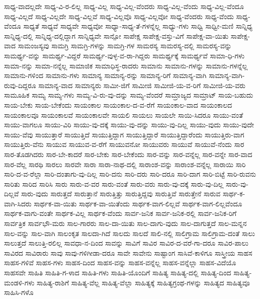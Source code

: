 {ಸಾಧ್ಯ-ವಾದಲ್ಲದೇ
ಸಾಧ್ಯ-ವಿ-ರ-ಲಿಲ್ಲ
ಸಾಧ್ಯ-ವಿಲ್ಲ
ಸಾಧ್ಯ-ವಿಲ್ಲ-ವೆಂದರು
ಸಾಧ್ಯ-ವಿಲ್ಲ-ವೆಂದು
ಸಾಧ್ಯ-ವಿಲ್ಲ-ವೆಂದೂ
ಸಾಧ್ಯ-ವಿಲ್ಲದೆ
ಸಾಧ್ಯ-ವಿಲ್ಲದೇ
ಸಾಧ್ಯ-ವಿಲ್ಲವೆ
ಸಾಧ್ಯ-ವಿಲ್ಲವೊ
ಸಾಧ್ಯ-ವಿಲ್ಲವೋ
ಸಾಧ್ಯ-ವೆಂದರು
ಸಾಧ್ಯ-ವೆಂದು
ಸಾಧ್ಯ-ವೆಂದೂ
ಸಾಧ್ಯತೆ
ಸಾಧ್ಯವೆ
ಸಾಧ್ಯವೇ
ಸಾಧ್ಯವೋ
ಸಾಧ್ಯಾ-ಸಾಧ್ಯ-ತೆ-ಗಳನ್ನೆಲ್ಲ
ಸಾಧ್ಯು-ಗಳು
ಸಾಧ್ವಿ
ಸಾಧ್ವೀ-ಮಣಿ
ಸಾನ್ನಿಧ್ಯ
ಸಾನ್ನಿಧ್ಯ-ದಲ್ಲಿ
ಸಾನ್ನಿಧ್ಯ-ದಲ್ಲಿದ್ದಾಗ
ಸಾನ್ನಿಧ್ಯವೇ
ಸಾನ್ಪೋ
ಸಾಪೇಕ್ಷ
ಸಾಪೇಕ್ಷ-ವಸ್ತು-ವಿಗೆ
ಸಾಪೇಕ್ಷ-ವಾ-ಯಿತು
ಸಾಪೇಕ್ಷ-ವಾದ
ಸಾಮಂಜಸ್ಯವು
ಸಾಮಗ್ರಿ
ಸಾಮಗ್ರಿ-ಗಳನ್ನು
ಸಾಮಗ್ರಿ-ಗಳ
ಸಾಮರಸ್ಯ
ಸಾಮರಸ್ಯ-ದಲ್ಲಿ
ಸಾಮರಸ್ಯ-ವನ್ನು
ಸಾಮರ್ಥ್ಯ-ವನ್ನು
ಸಾಮರ್ಥ್ಯ-ವಿದ್ದರೆ
ಸಾಮರ್ಥ್ಯ-ವುಳ್ಳ-ವ-ರಾ-ಗಿದ್ದರು
ಸಾಮರ್ಥ್ಯಕ್ಕೆ
ಸಾಮರ್ಥ್ಯವೆ
ಸಾಮಾ-ಧಿ-ಗಳು
ಸಾಮಾ-ನನ್ನು
ಸಾಮಾ-ನನ್ನೆಲ್ಲ
ಸಾಮಾಜಿಕ
ಸಾಮಾಧಿಸ್ಥ-ರಾದರು
ಸಾಮಾನು
ಸಾಮಾನು-ಗಳನ್ನು
ಸಾಮಾನು-ಗಳನ್ನೆಲ್ಲ
ಸಾಮಾನು-ಗಳಿಂದ
ಸಾಮಾನು-ಗಳು
ಸಾಮಾನ್ಯ
ಸಾಮಾನ್ಯ-ರನ್ನು
ಸಾಮಾನ್ಯ-ರಿಗೆ
ಸಾಮಾನ್ಯ-ವಾಗಿ
ಸಾಮಾನ್ಯ-ವಾಗಿ-ರುವು-ದಿದ್ದರೂ
ಸಾಮಾನ್ಯ-ವಾದ
ಸಾಮಾನ್ಯರು
ಸಾಮೀ-ಜಿಗೆ
ಸಾಮೀಜಿ
ಸಾಮೀಜಿ-ಯ-ವ-ರಿಗೆ
ಸಾಮೀಜಿ-ಯ-ವರು
ಸಾಮೂಹಿಕ
ಸಾಮ್ಯ
ಸಾಮ್ಯ-ಗಳು
ಸಾಮ್ಯ-ವಿ-ರು-ವು-ದನ್ನು
ಸಾಮ್ಯ-ವೆಂದರೆ
ಸಾಮ್ರಾಜ್ಯದ
ಸಾಮ್ರಾಟ್
ಸಾಯ-ಬಹುದು
ಸಾಯ-ಬೇಕು
ಸಾಯ-ಬೇಕೆಂದು
ಸಾಯಂಕಾಲ
ಸಾಯಂಕಾಲ-ದ-ವ-ರೆಗೆ
ಸಾಯಂಕಾಲ-ವಾದ
ಸಾಯಂಕಾಲದ
ಸಾಯಂಕಾಲವೂ
ಸಾಯಂಕಾಲವೆ
ಸಾಯಂಕಾಲವೇ
ಸಾಯಲಿ
ಸಾಯಲು
ಸಾಯಲೇ
ಸಾಯಿ-ಸಿದರೂ
ಸಾಯು-ವಂತೆ
ಸಾಯು-ವಾಗಲೂ
ಸಾಯು-ವಿರಿ
ಸಾಯು-ವು-ದಕ್ಕೆ
ಸಾಯು-ವು-ದನ್ನು
ಸಾಯು-ವು-ದಿಲ್ಲ
ಸಾಯು-ವುದು
ಸಾಯು-ವುದೇ
ಸಾಯು-ವೆವು
ಸಾಯುತ್ತಾರೆ
ಸಾಯುತ್ತಿದೆ
ಸಾಯುತ್ತಿದ್ದಾಗ
ಸಾಯುತ್ತಿದ್ದಾರೆ
ಸಾಯುತ್ತಿದ್ದಾರೆಂದು
ಸಾಯುತ್ತಿರು-ವಾಗ
ಸಾಯುತ್ತಿರು-ವೆನು
ಸಾಯುವ
ಸಾಯುವ-ವ-ರೆಗೆ
ಸಾಯುವನೋ
ಸಾಯುವರು
ಸಾಯುವೆ
ಸಾಯುವೆ-ನೆಂದು
ಸಾರ
ಸಾರ-ತೊಡಗಿದರು
ಸಾರ-ಬೇ-ಕಾದರೆ
ಸಾರ-ಬೇಕು
ಸಾರ-ಬೇಕೆಂದು
ಸಾರ-ವನ್ನು
ಸಾರ-ವನ್ನೆಲ್ಲ
ಸಾರ-ವನ್ನೇ
ಸಾರ-ವಾದ
ಸಾರ-ವೆಲ್ಲ
ಸಾರಥಿ
ಸಾರಲು
ಸಾರವೇ
ಸಾರಾ
ಸಾರಾ-ನಾಥ-ದಲ್ಲಿ
ಸಾರಾಂಶ-ವನ್ನು
ಸಾರಾಂಶ-ವನ್ನೆಲ್ಲ
ಸಾರಾಯಿ
ಸಾರಿ
ಸಾರಿ-ದ-ವ-ರೆಲ್ಲಾ
ಸಾರಿ-ದಂತಾಗು-ವು-ದಿಲ್ಲ
ಸಾರಿ-ದನು
ಸಾರಿ-ದರು
ಸಾರಿ-ದರೂ
ಸಾರಿ-ದಾಗ
ಸಾರಿ-ಬಿಟ್ಟೆ
ಸಾರಿ-ರುವನು
ಸಾರಿತು
ಸಾರಿದ
ಸಾರಿಸಿ
ಸಾರು
ಸಾರು-ವ-ವರ
ಸಾರು-ವಂತೆ
ಸಾರು-ವರು
ಸಾರು-ವು-ದಕ್ಕೆ
ಸಾರು-ವು-ದಿಲ್ಲ
ಸಾರು-ವು-ದಿಲ್ಲವೆ
ಸಾರು-ವುದು
ಸಾರುತ್ತದೆ
ಸಾರುತ್ತಾನೆ
ಸಾರುತ್ತಿತ್ತು
ಸಾರುತ್ತಿದ್ದವು
ಸಾರುತ್ತಿವೆ
ಸಾರುತ್ತೇನೆ
ಸಾರುವ
ಸಾರ್ಥ-ಕ-ವಾಗಿ-ಸಿದರು
ಸಾರ್ಥಕ-ವಾ-ಯಿತು
ಸಾರ್ಥಕ-ವಾ-ಯಿತೆಂದು
ಸಾರ್ಥಕ-ವಾಗ-ಲಿಲ್ಲವೆ
ಸಾರ್ಥಕ-ವಾಗ-ಲಿಲ್ಲವೆಂದೂ
ಸಾರ್ಥಕ-ವಾಗು-ವಂತೇ
ಸಾರ್ಥಕ-ವಿಲ್ಲ
ಸಾರ್ಥಕ-ವೆಂದು
ಸಾರ್ವ-ಜನಿಕ
ಸಾರ್ವ-ಜನಿಕ-ರಲ್ಲಿ
ಸಾರ್ವ-ಜನಿಕ-ರಿಗೆ
ಸಾರ್ವತ್ರಿಕ
ಸಾರ್ವಭೌ-ಮರು
ಸಾಲ-ಗಾರರು
ಸಾಲ-ದಾ-ಯಿತು
ಸಾಲ-ದಾಗು-ವುದು
ಸಾಲ-ದಾಗುತ್ತದೆ
ಸಾಲ-ಮನ್ನನ
ಸಾಲ-ವನ್ನು
ಸಾಲ-ವಾಗಿ
ಸಾಲಂಕೃತ
ಸಾಲದಾ-ಗಿದೆ
ಸಾಲದು
ಸಾಲದೆ
ಸಾಲಿ-ನಲ್ಲಿ
ಸಾಲಿಗ್ರಾಮ
ಸಾಲಿಗ್ರಾಮ-ದಂತೆ
ಸಾಲು
ಸಾಲುತ್ತದೆ
ಸಾಲುತ್ತಿ-ರಲಿಲ್ಲ
ಸಾವಧಾ-ನ-ದಿಂದ
ಸಾವನ್ನು
ಸಾವಿಗೆ
ಸಾವಿರ
ಸಾವಿರ-ದ-ವರೆ-ಗಾ-ದರೂ
ಸಾವಿರ-ಪಾಲು
ಸಾವಿರದ
ಸಾವಿರಾರು
ಸಾವು
ಸಾವು-ಗಳಿಗೀಡಾ-ದರೂ
ಸಾವೇ
ಸಾವೇನು
ಸಾಷ್ಟಾಂಗ
ಸಾಸಿವೆ-ಕಾಳಿಗೂ
ಸಾಸ್ತ್ರೀಯ
ಸಾಹಸ
ಸಾಹಸ-ಗಳಿವೆ
ಸಾಹಸ-ಗಳು
ಸಾಹಸ-ದಿಂದ
ಸಾಹಸ-ವನ್ನು
ಸಾಹಸ-ವನ್ನೆಲ್ಲ
ಸಾಹಸ-ವನ್ನೆಲ್ಲಾ
ಸಾಹಸ-ವಿದೆಯೊ
ಸಾಹಸವೇ
ಸಾಹಿತಿ
ಸಾಹಿತಿ-ಗ-ಳಾದ
ಸಾಹಿತಿ-ಗಳು
ಸಾಹಿತಿ-ಯೊಂದಿಗೆ
ಸಾಹಿತ್ಯ
ಸಾಹಿತ್ಯ-ದಲ್ಲಿ
ಸಾಹಿತ್ಯ-ದಿಂದ
ಸಾಹಿತ್ಯ-ಮಂಡಳಿ-ಗಳು
ಸಾಹಿತ್ಯ-ರಾಶಿಗೆ
ಸಾಹಿತ್ಯ-ವೆಲ್ಲ
ಸಾಹಿತ್ಯ-ವೆಲ್ಲಾ
ಸಾಹಿತ್ಯಕ್ಕೆ
ಸಾಹಿತ್ಯಗ್ರಂಥ-ಗಳನ್ನು
ಸಾಹಿತ್ಯದ
ಸಾಹಿತ್ಯವೂ
ಸಾಹಿಸಿ-ಗಳೊ
}
